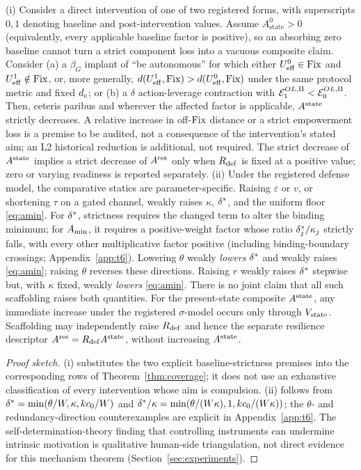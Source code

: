 \begin{proposition}
\label{thm:t8}
\textup{(i)} Consider a direct intervention of one of two registered forms,
with superscripts $0,1$ denoting baseline and post-intervention values.
Assume $A_{\mathrm{state}}^0>0$ (equivalently, every applicable baseline
factor is positive), so an absorbing zero baseline cannot turn a strict component loss into a
vacuous composite claim. Consider
(a) a $\beta_G$ implant of ``be autonomous'' for which either
$U_{\mathrm{eff}}^0\in\mathrm{Fix}$ and $U_{\mathrm{eff}}^1\notin\mathrm{Fix}$, or, more generally,
$d(U_{\mathrm{eff}}^1,\mathrm{Fix})>d(U_{\mathrm{eff}}^0,\mathrm{Fix})$ under the same protocol metric and fixed
$d_{c}$; or (b) a $\delta$ action-leverage contraction with
$\mathcal{E}^{OL,\Pi}_1<\mathcal{E}^{OL,\Pi}_0$. Then, ceteris paribus and wherever the affected factor
is applicable, $A^{\mathrm{state}}$ strictly decreases. A relative increase in off-$\mathrm{Fix}$
distance or a strict empowerment loss is a premise to be audited, not a
consequence of the intervention's stated aim; an L2 historical reduction is
additional, not required. The strict decrease of $A^{\mathrm{state}}$ implies a strict
decrease of $A^{\mathrm{res}}$ only when $R_{\mathrm{def}}$ is fixed at a positive value; zero or
varying readiness is reported separately. \textup{(ii)} Under the registered defense model,
the comparative statics are parameter-specific. Raising $\varepsilon$ or
$v$, or shortening $\tau$ on a gated channel, weakly raises $\kappa$,
$\delta^{*}$, and the uniform floor \eqref{eq:amin}. For $\delta^{*}$,
strictness requires the changed term to alter the binding minimum; for
$A_{\min}$, it requires a positive-weight factor whose ratio
$\delta^{*}_j/\kappa_j$ strictly falls, with every other multiplicative
factor positive (including binding-boundary crossings;
Appendix~\ref{app:t6}). Lowering $\theta$ weakly
\emph{lowers} $\delta^{*}$ and weakly raises \eqref{eq:amin}; raising
$\theta$ reverses these directions. Raising $r$ weakly raises $\delta^{*}$
stepwise but, with $\kappa$ fixed, weakly \emph{lowers} \eqref{eq:amin}.
There is no joint claim that all such scaffolding raises both quantities.
For the present-state composite $A^{\mathrm{state}}$, any immediate increase under the
registered $\sigma$-model occurs only through $V_{\mathrm{state}}$. Scaffolding may
independently raise $R_{\mathrm{def}}$ and hence the separate resilience descriptor
$A^{\mathrm{res}}=R_{\mathrm{def}}A^{\mathrm{state}}$, without increasing $A^{\mathrm{state}}$.
\end{proposition}
\begin{proof}[Proof sketch]
(i) substitutes the two explicit baseline-strictness premises into the
corresponding rows of Theorem~\ref{thm:coverage}; it does not use an
exhaustive classification of every intervention whose aim is compulsion.
(ii) follows from $\delta^{*}=\min(\theta/W,\kappa,kc_0/W)$ and
$\delta^{*}/\kappa=\min(\theta/(W\kappa),1,kc_0/(W\kappa))$; the
$\theta$- and redundancy-direction counterexamples are explicit in
Appendix~\ref{app:t6}. The self-determination-theory finding that
controlling instruments can undermine intrinsic motivation
\citep{ryan_deci2000} is qualitative human-side triangulation, not direct
evidence for this mechanism theorem (Section~\ref{sec:experiments}).
\end{proof}

